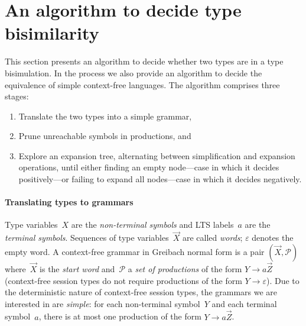 \section{An algorithm to decide type bisimilarity}
\label{sec:algorithm}



This section presents an algorithm to decide whether two types are in
a type bisimulation. In the process we also provide an algorithm to
decide the equivalence of simple context-free languages.
%
The algorithm comprises three stages:
%
\begin{enumerate}
\item Translate the two types into a simple grammar,
\item Prune unreachable symbols in productions, and
\item Explore an expansion tree, alternating between simplification
  and expansion operations, until either finding an empty node---case
  in which it decides positively---or failing to expand all nodes---case
  in which it decides negatively.
\end{enumerate}

\paragraph{Translating types to grammars}


Type variables~$X$ are the \emph{non-terminal symbols} and LTS
labels~$a$ are the \emph{terminal symbols}. Sequences of type
variables~$\vec X$ are called \emph{words}; $\varepsilon$ denotes the
empty word.
%
A context-free grammar in Greibach normal form is a pair
$(\vec X,\mathcal P)$ where~$\vec X$ is the \emph{start word}
and~$\mathcal P$ a \emph{set of productions} of the form
$Y \rightarrow a\vec Z$ (context-free session types do not require
productions of the form $Y \rightarrow\varepsilon$).
%
Due to the deterministic nature of context-free session types, the
grammars we are interested in are \emph{simple}: for each
non-terminal symbol~$Y$ and each terminal symbol~$a$, there is at most
one production of the form $Y \rightarrow a\vec Z$.

